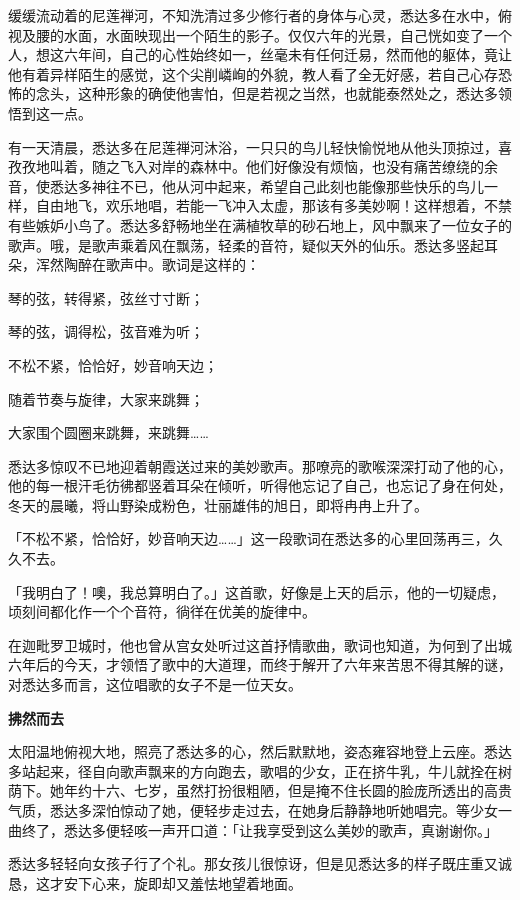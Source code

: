 \documentclass[12pt,twoside,openany]{book}
\newcommand{\mt}[1]{\textbullet \textbf{#1}}
\begin{document}
缓缓流动着的尼莲禅河，不知洗清过多少修行者的身体与心灵，悉达多在水中，俯视及腰的水面，水面映现出一个陌生的影子。仅仅六年的光景，自己恍如变了一个人，想这六年间，自己的心性始终如一，丝毫未有任何迁易，然而他的躯体，竟让他有着异样陌生的感觉，这个尖削嶙峋的外貌，教人看了全无好感，若自己心存恐怖的念头，这种形象的确使他害怕，但是若视之当然，也就能泰然处之，悉达多领悟到这一点。

有一天清晨，悉达多在尼莲禅河沐浴，一只只的鸟儿轻快愉悦地从他头顶掠过，喜孜孜地叫着，随之飞入对岸的森林中。他们好像没有烦恼，也没有痛苦缭绕的余音，使悉达多神往不已，他从河中起来，希望自己此刻也能像那些快乐的鸟儿一样，自由地飞，欢乐地唱，若能一飞冲入太虚，那该有多美妙啊！这样想着，不禁有些嫉妒小鸟了。悉达多舒畅地坐在满植牧草的砂石地上，风中飘来了一位女子的歌声。哦，是歌声乘着风在飘荡，轻柔的音符，疑似天外的仙乐。悉达多竖起耳朵，浑然陶醉在歌声中。歌词是这样的：

琴的弦，转得紧，弦丝寸寸断；

琴的弦，调得松，弦音难为听；

不松不紧，恰恰好，妙音响天边；

随着节奏与旋律，大家来跳舞；

大家围个圆圈来跳舞，来跳舞……

悉达多惊叹不已地迎着朝霞送过来的美妙歌声。那嘹亮的歌喉深深打动了他的心，他的每一根汗毛彷彿都竖着耳朵在倾听，听得他忘记了自己，也忘记了身在何处，冬天的晨曦，将山野染成粉色，壮丽雄伟的旭日，即将冉冉上升了。

「不松不紧，恰恰好，妙音响天边……」这一段歌词在悉达多的心里回荡再三，久久不去。

「我明白了！噢，我总算明白了。」这首歌，好像是上天的启示，他的一切疑虑，顷刻间都化作一个个音符，徜徉在优美的旋律中。

在迦毗罗卫城时，他也曾从宫女处听过这首抒情歌曲，歌词也知道，为何到了出城六年后的今天，才领悟了歌中的大道理，而终于解开了六年来苦思不得其解的谜，对悉达多而言，这位唱歌的女子不是一位天女。

\mt{拂然而去}

太阳温地俯视大地，照亮了悉达多的心，然后默默地，姿态雍容地登上云座。悉达多站起来，径自向歌声飘来的方向跑去，歌唱的少女，正在挤牛乳，牛儿就拴在树荫下。她年约十六、七岁，虽然打扮很粗陋，但是掩不住长圆的脸庞所透出的高贵气质，悉达多深怕惊动了她，便轻步走过去，在她身后静静地听她唱完。等少女一曲终了，悉达多便轻咳一声开口道：「让我享受到这么美妙的歌声，真谢谢你。」

悉达多轻轻向女孩子行了个礼。那女孩儿很惊讶，但是见悉达多的样子既庄重又诚恳，这才安下心来，旋即却又羞怯地望着地面。
\end{document}
